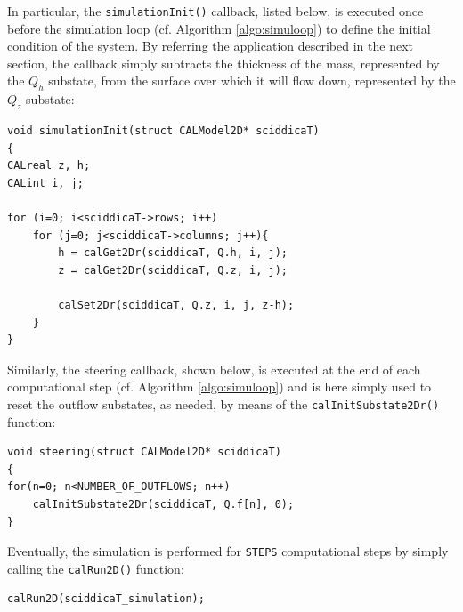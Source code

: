 \noindent In particular, the \verb'simulationInit()' callback, listed below,
is executed once before the simulation loop (cf. Algorithm
\ref{algo:simuloop}) to define the initial condition of the
system. By referring the application described in the next section,
the callback simply subtracts the thickness of the mass, represented
by the $Q_h$ substate, from the surface over which it will
flow down, represented by the $Q_z$ substate:

\begin{lstlisting}
void simulationInit(struct CALModel2D* sciddicaT)
{
CALreal z, h;
CALint i, j;

for (i=0; i<sciddicaT->rows; i++)
	for (j=0; j<sciddicaT->columns; j++){
		h = calGet2Dr(sciddicaT, Q.h, i, j);
		z = calGet2Dr(sciddicaT, Q.z, i, j);

		calSet2Dr(sciddicaT, Q.z, i, j, z-h);
	}
}
\end{lstlisting}

\noindent Similarly, the steering callback, shown below, is executed at the
end of each computational step (cf. Algorithm \ref{algo:simuloop})
and is here simply used to reset the outflow substates, as needed,
by means of the \verb'calInitSubstate2Dr()' function:

\begin{lstlisting}
void steering(struct CALModel2D* sciddicaT)
{
for(n=0; n<NUMBER_OF_OUTFLOWS; n++)
	calInitSubstate2Dr(sciddicaT, Q.f[n], 0);
}
\end{lstlisting}

\noindent Eventually, the simulation is performed for \verb'STEPS'
computational steps by simply calling the \verb'calRun2D()'
function:

\begin{lstlisting}
calRun2D(sciddicaT_simulation);
\end{lstlisting}


